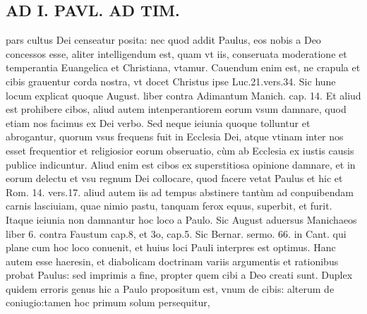 \documentclass{article}
\begin{document}
\begin{pages}
\section*{AD I. PAVL. AD TIM. }
\marginpar{[ p.186 ]}\pstart pars cultus Dei censeatur posita: nec quod addit Paulus, eos nobis a Deo concessos esse, aliter intelligendum est, quam vt iis, conseruata moderatione et temperantia Euangelica et Christiana, vtamur. Cauendum enim est, ne crapula et cibis grauentur corda nostra, vt docet Christus ipse Luc.21.vers.34. Sic hune locum explicat quoque August. liber  contra Adimantum Manich. cap. 14. Et aliud est prohibere cibos, aliud autem intenperantiorem eorum vsum damnare, quod etiam nos facimus ex Dei verbo.  \pend\pstart Sed neque ieiunia quoque tolluntur et abrogantur, quorum vsus frequens fuit in Ecclesia Dei, atque vtinam inter nos esset frequentior et religiosior eorum obseruatio, cùm ab Ecclesia ex iustis causis publice indicuntur. Aliud enim est cibos ex superstitiosa opinione damnare, et in eorum delectu et vsu regnum Dei collocare, quod facere vetat Paulus et hic et Rom. 14. vers.17. aliud autem iis ad tempus abstinere tantùm ad conpuibendam carnis lasciuiam, quae nimio pastu, tanquam ferox equus, superbit, et furit. Itaque ieiunia non damnantur hoc loco a Paulo. Sic August aduersus Manichaeos liber 6. contra Faustum cap.8, et 3o, cap.5. Sic Bernar. sermo. 66. in Cant. qui plane cum hoc loco conuenit, et huius loci Pauli interpres est optimus.  \pend\pstart Hanc autem esse haeresin, et diabolicam doctrinam variis argumentis et rationibus probat Paulus: sed imprimis a fine, propter quem cibi a Deo creati sunt. Duplex quidem erroris genus hic a Paulo propositum est, vnum de cibis: alterum de coniugio:tamen hoc primum solum persequitur,  \pend

\end{pages}
\end{document}
